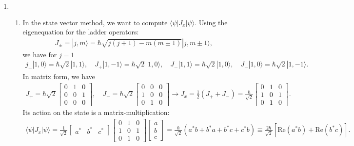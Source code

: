 \documentclass[letterpaper,11pt,twoside]{article}
\newcommand{\ket}[1]{|#1\rangle}
\newcommand{\braket}[1]{\langle#1\rangle}
\newcommand{\re}[1]{\text{Re}\left(#1\right)}
\begin{document}
\begin{enumerate}[itemsep=0pt,topsep=0pt,label=\alph*)]
  \item 
\begin{enumerate}[itemsep=0pt,topsep=0pt,label=\roman*)]
  \item In the state vector method, we want to compute $\braket{\psi|J_x|\psi}$. Using the eigenequation for the ladder operators:
  \begin{align*}
    J_\pm=\ket{j,m}=\hbar\sqrt{j(j+1)-m(m\pm1)}\ket{j,m\pm1},
  \end{align*}
  we have for $j=1$
  \begin{align*}
    j_+\ket{1,0}=\hbar\sqrt{2}\ket{1,1},\quad J_+\ket{1,-1}=\hbar\sqrt{2}\ket{1,0},\quad J_-\ket{1,1}=\hbar\sqrt{2}\ket{1,0},\quad J_-\ket{1,0}=\hbar\sqrt{2}\ket{1,-1}.
  \end{align*}
  In matrix form, we have 
  \begin{align*}
    J_+=\hbar\sqrt{2}\begin{bmatrix}
      0&1&0\\0&0&1\\0&0&0
    \end{bmatrix},\quad J_-=\hbar\sqrt{2}\begin{bmatrix}
      0&0&0\\1&0&0\\0&1&0
    \end{bmatrix}\longrightarrow J_x=\frac{1}{2}(J_++J_-)=\frac{\hbar}{\sqrt{2}}\begin{bmatrix}
      0&1&0\\1&0&1\\0&1&0
    \end{bmatrix}.
  \end{align*}
  Its action on the state is a matrix-multiplication:
  \begin{align*}
    \braket{\psi|J_x|\psi}=\frac{1}{\sqrt{2}}\begin{bmatrix}
      a^*&b^*&c^*
    \end{bmatrix}\begin{bmatrix}
      0&1&0\\1&0&1\\0&1&0
    \end{bmatrix}\begin{bmatrix}
      a\\b\\c
    \end{bmatrix}=\frac{\hbar}{\sqrt{2}}(a^*b+b^*a+b^*c+c^*b)\equiv\frac{2\hbar}{\sqrt{2}}[\re{a^*b}+\re{b^*c}].

\end{align*}
\end{enumerate}
\end{enumerate}
\end{document}
